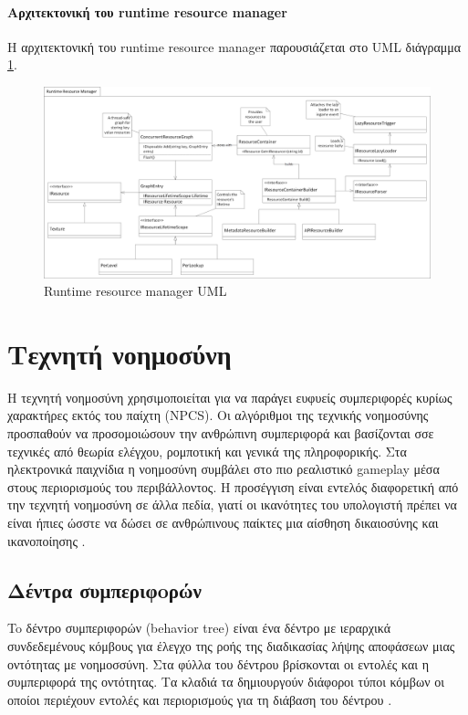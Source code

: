 \paragraph{Αρχιτεκτονική του runtime resource manager}
Η αρχιτεκτονική του runtime resource manager παρουσιάζεται στο \gls{UML} διάγραμμα \ref{fig:runtime_resource_uml}.
\begin{figure}[h!]
	\centering
	\includegraphics[width=165mm]{Images/runtime_resource_manager}
	\caption{Runtime resource manager UML}
	\label{fig:runtime_resource_uml}
\end{figure}

\section{Τεχνητή νοημοσύνη}
Η τεχνητή νοημοσύνη χρησιμοποιείται για να παράγει ευφυείς συμπεριφορές κυρίως χαρακτήρες εκτός του παίχτη (NPCS). Οι αλγόριθμοι της τεχνικής νοημοσύνης προσπαθούν να προσομοιώσουν την ανθρώπινη συμπεριφορά και βασίζονται σσε τεχνικές από θεωρία ελέγχου, ρομποτική και γενικά της πληροφορικής. Στα ηλεκτρονικά παιχνίδια η νοημοσύνη συμβάλει στο πιο ρεαλιστικό gameplay μέσα στους περιορισμούς του περιβάλλοντος. Η προσέγγιση είναι εντελός διαφορετική από την τεχνητή νοημοσύνη σε άλλα πεδία, γιατί οι ικανότητες του υπολογιστή πρέπει να είναι ήπιες ώσστε να δώσει σε ανθρώπινους παίκτες μια αίσθηση δικαιοσύνης και ικανοποίησης \cite{Sousa:2002:GPO:580160}.
 
\subsection{Δέντρα συμπεριφoρών}	
To δέντρο συμπεριφορών (behavior tree) είναι ένα δέντρο με ιεραρχικά συνδεδεμένους κόμβους για έλεγχο της ροής της διαδικασίας λήψης αποφάσεων μιας οντότητας με νοημοσσύνη. Στα φύλλα του δέντρου βρίσκονται οι εντολές και η συμπεριφορά της οντότητας. Τα κλαδιά τα δημιουργούν διάφοροι τύποι κόμβων οι οποίοι περιέχουν εντολές και περιορισμούς για τη διάβαση του δέντρου \cite{champandard2007understanding}.

